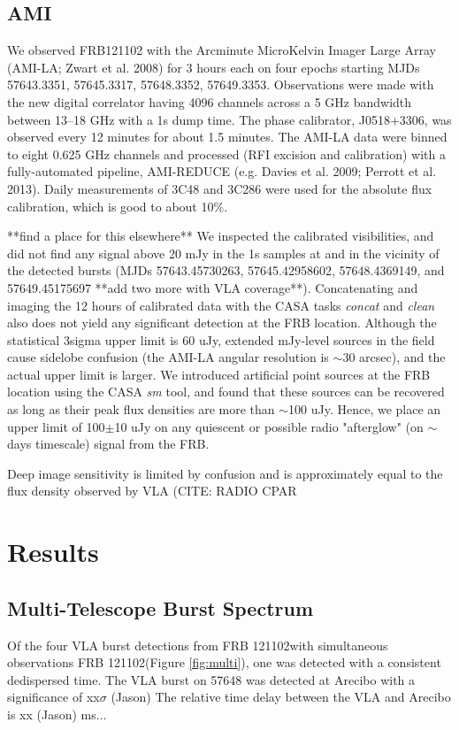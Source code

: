 \documentclass[twocolumn]{aastex61}
\newcommand{\frb}{FRB 121102}
\begin{document}
\subsection{AMI}

We observed FRB121102 with the Arcminute MicroKelvin Imager Large Array (AMI-LA; Zwart et al. 2008) for 3 hours each on four epochs starting MJDs 57643.3351, 57645.3317, 57648.3352, 57649.3353. Observations were made with the new digital correlator having 4096 channels across a 5 GHz bandwidth between 13--18 GHz with a 1s dump time. The phase calibrator, J0518+3306, was observed every 12 minutes for about 1.5 minutes. The AMI-LA data were binned to eight 0.625 GHz channels and processed (RFI excision and calibration) with a fully-automated pipeline, AMI-REDUCE (e.g. Davies et al. 2009; Perrott et al. 2013). Daily measurements of 3C48 and 3C286 were used for the absolute flux calibration, which is good to about 10\%. 

**find a place for this elsewhere**
We inspected the calibrated visibilities, and did not find any signal above 20 mJy in the 1s samples at and in the vicinity of the detected bursts (MJDs 57643.45730263, 57645.42958602, 57648.4369149, and 57649.45175697 **add two more with VLA coverage**). Concatenating and imaging the 12 hours of calibrated data with the CASA tasks {\it concat} and {\it clean} also does not yield any significant detection at the FRB location. Although the statistical 3sigma upper limit is 60 uJy, extended mJy-level sources in the field cause sidelobe confusion (the AMI-LA angular resolution is $\sim$30 arcsec), and the actual upper limit is larger. We introduced artificial point sources at the FRB location using the CASA {\it sm} tool, and found that these sources can be recovered as long as their peak flux densities are more than $\sim$100 uJy. Hence, we place an upper limit of 100$\pm$10 uJy on any quiescent or possible radio "afterglow" (on $\sim$days timescale) signal from the FRB.

Deep image sensitivity is limited by confusion and is approximately equal to the flux density observed by VLA (CITE: RADIO CPAR

\section{Results}

\subsection{Multi-Telescope Burst Spectrum}
Of the four VLA burst detections from \frb with simultaneous observations \frb (Figure \ref{fig:multi}), one was detected with a consistent dedispersed time. The VLA burst on 57648 was detected at Arecibo with a significance of {\color{red} xx$\sigma$ (Jason)} The relative time delay between the VLA and Arecibo is {\color{red} xx (Jason)} ms...
\end{document}
